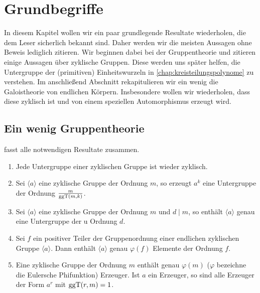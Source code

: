 \chapter{Grundbegriffe}
\label{chap:grundbegriffe}

In diesem Kapitel wollen wir ein paar grundlegende Resultate wiederholen, die
dem Leser sicherlich bekannt sind. Daher werden wir die meisten Aussagen ohne
Beweis lediglich zitieren. Wir beginnen dabei bei der Gruppentheorie und
zitieren einige Aussagen über zyklische Gruppen. Diese werden uns später
helfen, die Untergruppe der (primitiven) Einheitswurzeln
in \autoref{chap:kreisteilungspolynome} zu verstehen. Im anschließend Abschnitt
rekapitulieren wir ein wenig die Galoistheorie von endlichen Körpern.
Insbesondere wollen wir wiederholen, dass diese zyklisch ist und von einem
speziellen Automorphismus erzeugt wird.

\section{Ein wenig Gruppentheorie}


\autocite[Theorem 1.15]{lidl1997finite} fasst alle notwendigen Resultate
zusammen.

\begin{satz}
  \label{satz:zykl_gruppen}
  \begin{enumerate}
    \item Jede Untergruppe einer zyklischen Gruppe ist wieder zyklisch.
    \item Sei $\langle a \rangle$ eine zyklische Gruppe der Ordnung $m$,
      so erzeugt $a^k$ eine Untergruppe der Ordnung $\frac{m}{\operatorname{ggT}(m,k)}$.
    \item Sei $\langle a\rangle$ eine zyklische Gruppe der Ordnung $m$ und
      $d \mid m$, so enthält $\langle a \rangle$ genau eine Untergruppe der
  u    Ordnung $d$.
     \item Sei $f$ ein positiver Teiler der Gruppenordnung einer endlichen
        zyklischen Gruppe $\langle a \rangle$. Dann enthält $\langle a \rangle$
        genau $\varphi(f)$ Elemente der Ordnung $f$.
     \item Eine zyklische Gruppe der Ordnung $m$ enthält genau $\varphi(m)$
        ($\varphi$ bezeichne die Eulersche Phifunktion)
        Erzeuger. Ist $a$ ein Erzeuger, so sind alle Erzeuger der Form
        $a^r$ mit $\operatorname{ggT}(r,m) = 1$.
  \end{enumerate}
\end{satz}

